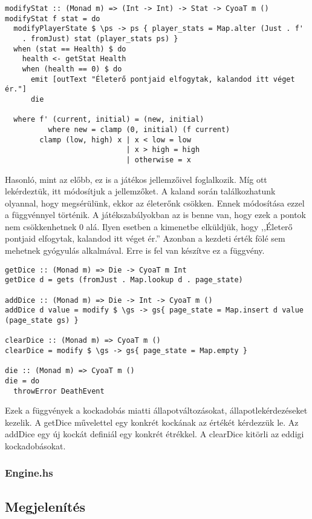 \documentclass[12pt,a4paper,oneside]{report}
\begin{document}
    \begin{verbatim}
modifyStat :: (Monad m) => (Int -> Int) -> Stat -> CyoaT m ()
modifyStat f stat = do
  modifyPlayerState $ \ps -> ps { player_stats = Map.alter (Just . f'
    . fromJust) stat (player_stats ps) }
  when (stat == Health) $ do
    health <- getStat Health
    when (health == 0) $ do
      emit [outText "Életerő pontjaid elfogytak, kalandod itt véget ér."]
      die

  where f' (current, initial) = (new, initial)
          where new = clamp (0, initial) (f current)
        clamp (low, high) x | x < low = low
                            | x > high = high
                            | otherwise = x
    \end{verbatim}
    Hasonló, mint az előbb, ez is a játékos jellemzőivel
    foglalkozik. Míg ott lekérdeztük, itt módosítjuk a jellemzőket. A
    kaland során találkozhatunk olyannal, hogy megsérülünk, ekkor az
    életerőnk csökken. Ennek módosítása ezzel a függvénnyel
    történik. A játékszabályokban az is benne van, hogy ezek a pontok
    nem csökkenhetnek 0 alá. Ilyen esetben a kimenetbe elküldjük, hogy
    ,,Életerő pontjaid elfogytak, kalandod itt véget ér.'' Azonban a
    kezdeti érték fölé sem mehetnek gyógyulás alkalmával. Erre is fel
    van készítve ez a függvény.

    \begin{verbatim}
getDice :: (Monad m) => Die -> CyoaT m Int
getDice d = gets (fromJust . Map.lookup d . page_state)

addDice :: (Monad m) => Die -> Int -> CyoaT m ()
addDice d value = modify $ \gs -> gs{ page_state = Map.insert d value (page_state gs) }

clearDice :: (Monad m) => CyoaT m ()
clearDice = modify $ \gs -> gs{ page_state = Map.empty }

die :: (Monad m) => CyoaT m ()
die = do
  throwError DeathEvent
  \end{verbatim}

    Ezek a függvények a kockadobás miatti állapotváltozásokat,
    állapotlekérdezéseket kezelik. A getDice művelettel egy konkrét
    kockának az értékét kérdezzük le. Az addDice egy új kockát
    definiál egy konkrét étrékkel. A clearDice kitörli az eddigi kockadobásokat.

      \subsubsection{Engine.hs}
    \subsection{Megjelenítés}
\end{document}
